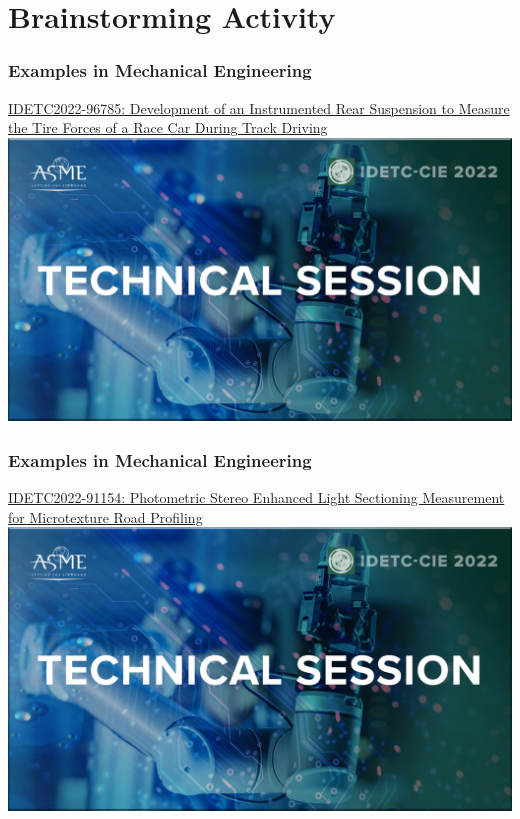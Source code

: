 \documentclass[fleqn]{beamer} %
\newcommand{\sectiontitleIV}{Brainstorming Activity}
\newcommand{\sectiontitleV}{Examples in Mechanical Engineering }
\begin{document}
\section{\sectiontitleIV}

\begin{frame}[label=sectionV]
\frametitle{\sectiontitleV}
\href{https://events-platform.asmeconferences.org/event/idetc-cie-2022/planning/UGxhbm5pbmdfOTcxMjI2}{IDETC2022-96785: Development of an Instrumented Rear Suspension to Measure the Tire Forces of a Race Car During Track Driving}\vspace{5mm}\\

\includegraphics[scale=0.125]{IDETC_technical_session.png}

\end{frame}

\begin{frame}[label=sectionV]
\frametitle{\sectiontitleV}

\href{https://events-platform.asmeconferences.org/event/idetc-cie-2022/planning/UGxhbm5pbmdfOTcxMzIx}{IDETC2022-91154: Photometric Stereo Enhanced Light Sectioning Measurement for Microtexture Road Profiling}\vspace{5mm}\\

\includegraphics[scale=0.125]{IDETC_technical_session.png}
 
\end{frame}
\end{document}
